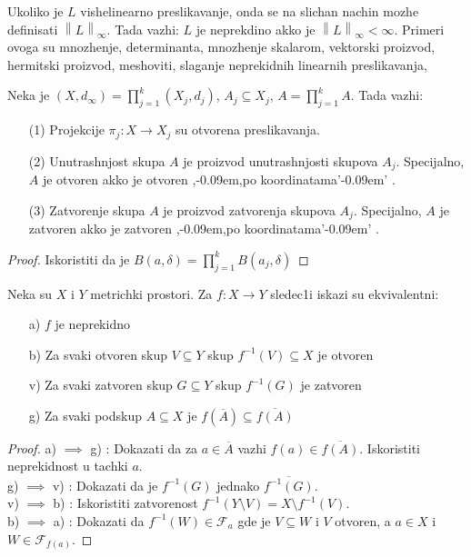 \documentclass[a4paper,12pt]{article}
\newcommand{\psj}{\subseteq}
\newcommand{\ds}{\displaystyle}
\newcommand{\norm}[1]{\left\lVert#1\right\rVert}
\def\zn{,\kern-0.09em,} %
\def\zng{'\kern-0.09em' } %
\begin{document}
\begin{nap}
	Ukoliko je $L$ vishelinearno preslikavanje, onda se na slichan nachin mozhe definisati $\norm L _{\infty}$. Tada
	vazhi: $L$ je neprekdino akko je $\norm L _{\infty} < \infty$. Primeri ovoga su mnozhenje, determinanta, 
	mnozhenje skalarom, vektorski proizvod, hermit\-ski proizvod, meshoviti, slaganje neprekidnih
	linearnih preslikavanja, \dotso
\end{nap}

\newpage

\begin{tvr}
	Neka je $\ds{(X,d_\infty) = \prod_{j=1}^{k}(X_j, d_j)}$, $A_j\psj X_j$, $\ds{A = \prod_{j=1}^{k}A}$. Tada vazhi:
	\begin{enumerate}
		\item[(1)] Projekcije $\pi_j:X \to X_j$ su otvorena preslikavanja.
		\item[(2)] Unutrashnjost skupa $A$ je proizvod unutrashnjosti skupova $A_j$. Specijalno, $A$ je otvoren akko je otvoren \zn po koordinatama\zng.
		\item[(3)] Zatvorenje skupa $A$ je proizvod zatvorenja skupova $A_j$. Specijalno, $A$ je zatvoren akko je zatvoren \zn po koordinatama\zng.
	\end{enumerate}
\end{tvr}
\begin{proof}
	Iskoristiti da je $\ds{B(a, \delta) = \prod_{j=1}^{k}B(a_j, \delta)}$
\end{proof}

\begin{tma}
Neka su $X$ i $Y$ metrichki prostori. Za $f:X \to Y$ sledec1i iskazi su ekviva\-lentni:
\begin{itemize}
\item[a)] $f$ je neprekidno
\item[b)] Za svaki otvoren skup $V \psj Y$ skup $f^{-1}(V) \psj X$ je otvoren
\item[v)] Za svaki zatvoren skup $G \psj Y$ skup $f^{-1}(G)$ je zatvoren
\item[g)] Za svaki podskup $A \psj X$ je $f(\overline{A}) \psj \overline{f(A)}$
\end{itemize}
\end{tma}

\begin{proof}
a) $\implies$ g) : Dokazati da za $a\in \overline{A}$ vazhi $f(a) \in \overline{f(A)}$. Iskoristiti neprekidnost u tachki $a$. \\ 
g) $\implies$ v) : Dokazati da je $f^{-1}(G)$ jednako $\overline{f^{-1}(G)}$. \\
v) $\implies$ b) : Iskoristiti zatvorenost $f^{-1}(Y \setminus V) = X \setminus f^{-1}(V)$. \\
b) $\implies$ a) : Dokazati da $f^{-1}(W) \in \mathcal{F}_a$ gde je $V \psj W$ i $V$ otvoren, a $a \in X$ i $W \in \mathcal{F}_{f(a)}$. 
\end{proof}
\end{document}
